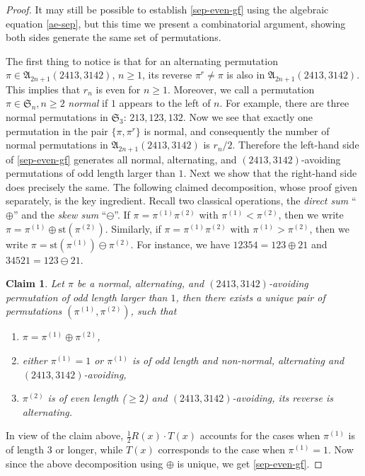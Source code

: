 \documentclass[12pt,reqno]{amsart}
\numberwithin{equation}{section}
\theoremstyle{plain}
\newtheorem{claim}[theorem]{Claim}
\theoremstyle{definition}
\def\S{\mathfrak{S}}
\def\A{\mathfrak{A}}
\def\st{\textrm{st}}
\begin{document}
\begin{proof}
It may still be possible to establish \eqref{sep-even-gf} using the algebraic equation \eqref{ae-sep}, but this time we present a combinatorial argument, showing both sides generate the same set of permutations.

The first thing to notice is that for an alternating permutation $\pi\in\A_{2n+1}(2413,3142)$, $n\ge 1$, its reverse $\pi^r\neq \pi$ is also in $\A_{2n+1}(2413,3142)$. This implies that $r_n$ is even for $n\ge 1$. Moreover, we call a permutation $\pi\in\S_n, n\ge 2$ {\em normal} if $1$ appears to the left of $n$. For example, there are three normal permutations in $\S_3$: $213,123,132$. Now we see that exactly one permutation in the pair $\{\pi,\pi^r\}$ is normal, and consequently the number of normal permutations in $\A_{2n+1}(2413,3142)$ is $r_n\slash 2$. Therefore the left-hand side of \eqref{sep-even-gf} generates all normal, alternating, and $(2413,3142)$-avoiding permutations of odd length larger than $1$. Next we show that the right-hand side does precisely the same. The following claimed decomposition, whose proof given separately, is the key ingredient. Recall two classical operations, the \emph{direct sum} ``$\oplus$'' and the \emph{skew sum} ``$\ominus$''. If $\pi=\pi^{(1)}\pi^{(2)}$ with $\pi^{(1)}<\pi^{(2)}$, then we write $\pi=\pi^{(1)}\oplus\st(\pi^{(2)})$. Similarly, if $\pi=\pi^{(1)}\pi^{(2)}$ with $\pi^{(1)}>\pi^{(2)}$, then we write $\pi=\st(\pi^{(1)})\ominus\pi^{(2)}$. For instance, we have $12354=123\oplus 21$ and $34521=123\ominus 21$.
\begin{claim}\label{claim}
Let $\pi$ be a normal, alternating, and $(2413,3142)$-avoiding permutation of odd length larger than $1$, then there exists a unique pair of permutations $(\pi^{(1)},\pi^{(2)})$, such that
\begin{enumerate}
    \item $\pi=\pi^{(1)}\oplus\pi^{(2)}$,
    \item either $\pi^{(1)}=1$ or $\pi^{(1)}$ is of odd length and non-normal, alternating and $(2413,3142)$-avoiding,
    \item $\pi^{(2)}$ is of even length ($\ge 2$) and $(2413,3142)$-avoiding, its reverse is alternating.
\end{enumerate}
\end{claim}
In view of the claim above, $\frac{1}{2}R(x)\cdot T(x)$ accounts for the cases when $\pi^{(1)}$ is of length $3$ or longer, while $T(x)$ corresponds to the case when $\pi^{(1)}=1$. Now since the above decomposition using $\oplus$ is unique, we get \eqref{sep-even-gf}.


\end{proof}
\end{document}
